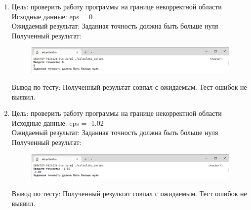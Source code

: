 \documentclass[a4paper]{article}
\begin{document}
	\begin{enumerate}[label=\textbf{Тест \arabic*}]
		\item Цель: проверить работу программы на границе некорректной области \\
		Исходные данные: eps = 0 \\
		Ожидаемый результат: Заданная точность должна быть больше нуля \\
		Полученный результат:
		
		\begin{figure}[h]
			\includegraphics[width=\textwidth,trim=0.5mm 0 0 0.5mm,clip]{tests/test0.png}
		\end{figure}
	
		Вывод по тесту: Полученный результат совпал с ожидаемым. Тест ошибок не выявил.
		\vspace{5mm}
		
		\item Цель: проверить работу программы на границе некорректной области \\
		Исходные данные: eps = -1.02 \\
		Ожидаемый результат: Заданная точность должна быть больше нуля \\
		Полученный результат:
		
		\begin{figure}[h]
			\includegraphics[width=\textwidth,trim=0.5mm 0 0 0.5mm,clip]{tests/test-1.02.png}
		\end{figure}
	
		Вывод по тесту: Полученный результат совпал с ожидаемым. Тест ошибок не выявил.
	\end{enumerate}
	
\end{document}
